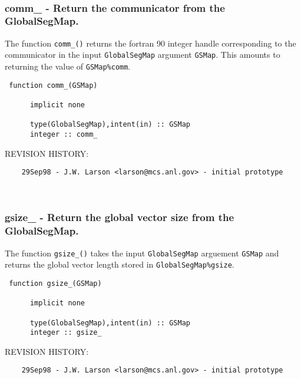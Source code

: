 
\mbox{}\hrulefill\ 
 

 \subsubsection{comm\_ - Return the communicator from the GlobalSegMap.}


 
  The function {\tt comm\_()} returns the fortran 90 integer handle
  corresponding to the communicator in the input {\tt GlobalSegMap}
  argument {\tt GSMap}.  This amounts to returning the value of 
  {\tt GSMap\%comm}.
 
\begin{verbatim} 
 function comm_(GSMap)
 
      implicit none
 
      type(GlobalSegMap),intent(in) :: GSMap
      integer :: comm_
 \end{verbatim}{\sf REVISION HISTORY:}
\begin{verbatim}  	29Sep98 - J.W. Larson <larson@mcs.anl.gov> - initial prototype\end{verbatim}
 
 
\mbox{}\hrulefill\ 
 

 \subsubsection{gsize\_ - Return the global vector size from the GlobalSegMap.}


 
  The function {\tt gsize\_()} takes the input {\tt GlobalSegMap} 
  arguement {\tt GSMap} and returns the global vector length stored
  in {\tt GlobalSegMap\%gsize}.
 
\begin{verbatim} 
 function gsize_(GSMap)
 
      implicit none
 
      type(GlobalSegMap),intent(in) :: GSMap
      integer :: gsize_
 \end{verbatim}{\sf REVISION HISTORY:}
\begin{verbatim}  	29Sep98 - J.W. Larson <larson@mcs.anl.gov> - initial prototype\end{verbatim}
 
